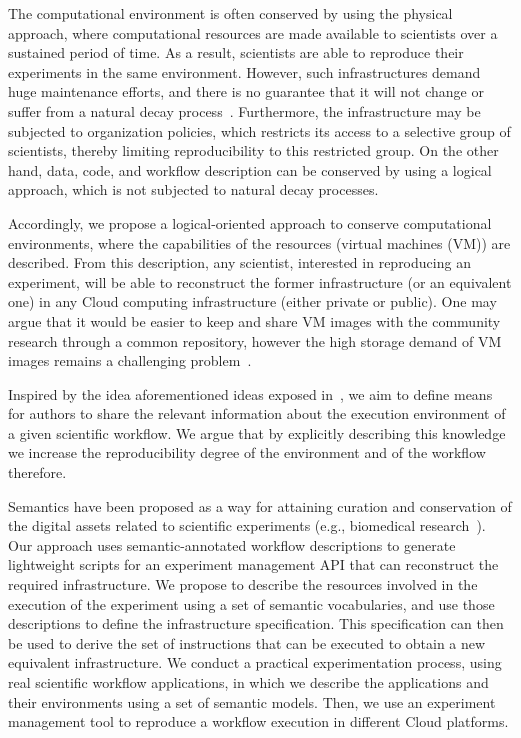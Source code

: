 The computational environment is often conserved by using the physical approach, where 
computational resources are made available to scientists over a sustained period of time. 
As a result, scientists are able to reproduce their experiments in the same environment. 
However, such infrastructures demand huge maintenance efforts, and there is no guarantee 
that it will not change or suffer from a natural decay process~\cite{Gavish2011637}. 
Furthermore, the infrastructure may be subjected to organization policies, which restricts 
its access to a selective group of scientists, thereby limiting reproducibility to this restricted 
group. On the other hand, data, code, and workflow description can be conserved by using 
a logical approach, which is not subjected to natural decay processes.

Accordingly, we propose a logical-oriented approach to conserve computational environments, 
where the capabilities of the resources (virtual machines (VM)) are described. From this 
description, any scientist, interested in reproducing an experiment, will be able to reconstruct 
the former infrastructure (or an equivalent one) in any Cloud computing infrastructure (either 
private or public). One may argue that it would be easier to keep and share VM images with 
the community research through a common repository, however the high storage demand of 
VM images remains a challenging problem~\cite{Mao:2014:ROD:2600090.2512348,6552826}. 


Inspired by the idea aforementioned ideas exposed in~\cite{King1995}, we aim to  define means 
for authors to share the relevant information about the execution environment of a given scientific
workflow. We argue that by explicitly describing this knowledge we increase the reproducibility
degree of the environment and of the workflow therefore.

Semantics have been proposed as a way for attaining curation and conservation of the digital 
assets related to scientific experiments (e.g., biomedical research~\cite{MaloneSWO2014}). 
Our approach uses semantic-annotated workflow descriptions to generate lightweight scripts 
for an experiment management API that can reconstruct the required infrastructure. We 
propose to describe the resources involved in the execution of the experiment using a set of 
semantic vocabularies, and use those descriptions to define the infrastructure specification. 
This specification can then be used to derive the set of instructions that can be executed to 
obtain a new equivalent infrastructure. We conduct a practical experimentation process,  using real scientific 
workflow applications, in which we describe the applications and their environments using a 
set of semantic models. Then, we use an experiment management tool to reproduce a 
workflow execution in different Cloud platforms.

